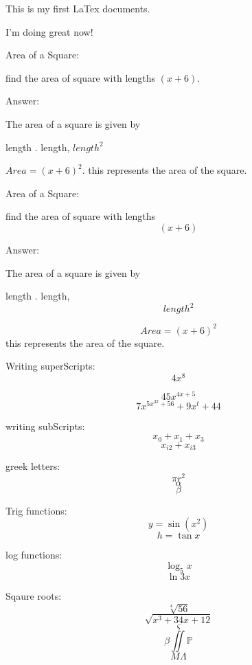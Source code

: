 \documentclass[11pt]{article}
\begin{document}
This is my first LaTex documents.

I'm doing great now!

Area of a Square:

find the area of square with lengths $(x+6)$.

Answer:

The area of a square is given by


length $.$ length, $length^2$

$Area = (x+6)^2$. this represents the area of the square.


Area of a Square:

find the area of square with lengths $$(x+6)$$

Answer:

The area of a square is given by


length $.$ length, $$length^2$$

$$Area = (x+6)^2$$this represents the area of the square.


Writing superScripts: $$4x^8$$

$$45x^{4x+5}$$
$$7x^{5x^{32}+56} + 9x^t + 44$$



writing subScripts: $$x_0 + x_1 + x_3$$
$$x_{i2}+x_{i3}$$


greek letters:
$$\pi r^2$$
$$\alpha$$
$$\beta$$


Trig functions:
$$y=\sin(x^2)$$
$$h=\tan{x}$$


log functions:$$\log_5{x}$$
$$\ln{3x}$$


Sqaure roots:
$$\sqrt[4]{56}$$
$$\sqrt{x^3+34x+12}$$
$$\varsigma$$
$$\beta \iint \mathbb{P}$$
$$M \varLambda $$
\end{document}

